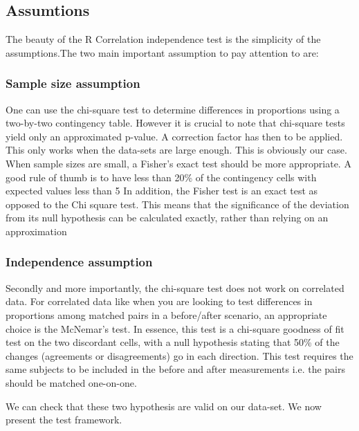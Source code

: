 \documentclass[a4paper]{article}
\theoremstyle{definition}
\theoremstyle{proposition}
\begin{document}
\subsection{Assumtions}
The beauty of the R Correlation independence test is the simplicity of the assumptions.The two main important assumption to pay attention to are:

\subsubsection{Sample size assumption}
One can use the chi-square test to determine differences in proportions using a two-by-two contingency table. However it is crucial to note that chi-square tests yield only an approximated p-value. A correction factor has then to be applied. This only works when the data-sets are large enough. This is obviously our case. When sample sizes are small, a Fisher's exact test  should be more appropriate. A good rule of thumb is to have less than 20\% of the contingency cells with expected values less than 5 
In addition, the Fisher test is an exact test as opposed to the Chi square test. This means that the significance of the deviation from its null hypothesis can be calculated exactly, rather than relying on an approximation

\subsubsection{Independence assumption}
Secondly and more importantly, the chi-square test does not work on correlated data. For correlated data like when you are looking to test differences in proportions among matched pairs in a before/after scenario, an appropriate choice is the McNemar's test. In essence, this test is a chi-square goodness of fit test on the two discordant cells, with a null hypothesis stating that 50\% of the changes (agreements or disagreements) go in each direction. This test requires the same subjects to be included in the before and after measurements i.e. the pairs should be matched one-on-one.  

We can check that these two hypothesis are valid on our data-set. We now present the test framework.
\end{document}
